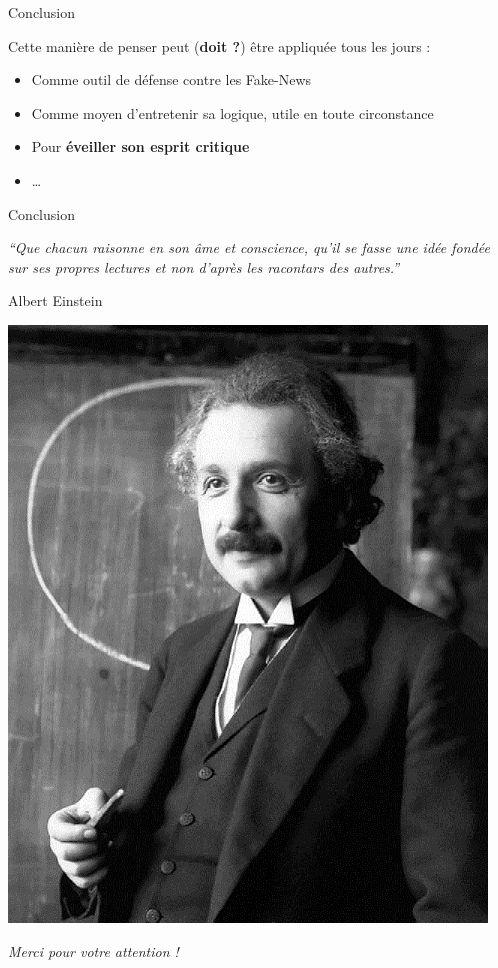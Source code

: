 \documentclass[usenames, dvipsnames]{beamer}
\begin{document}
\begin{frame}[plain]{Conclusion}

Cette manière de penser peut (\textbf{doit ?}) être appliquée tous les jours \pause : 
\begin{itemize}
\item Comme outil de défense contre les Fake-News
\item Comme moyen d'entretenir sa logique, utile en toute circonstance
\item Pour \textbf{\alert{éveiller son esprit critique}}
\item \ldots
\end{itemize}

\end{frame}



\begin{frame}[plain]{Conclusion}
\begin{center}
\itshape
``Que chacun raisonne en son âme et conscience, qu'il se fasse une idée fondée sur ses propres lectures et non d'après les racontars des autres.''
\end{center}

\begin{flushright}
Albert Einstein
\end{flushright}

\begin{center}
\includegraphics[scale=0.2]{images/Einstein.jpg}
\end{center}
\end{frame}


\begin{frame}[plain]
\vspace{2cm}
{\huge\color{umons-red}
\begin{center}
\textit{\textrm{Merci pour votre attention !}}
\end{center}}
\end{frame}
\end{document}
